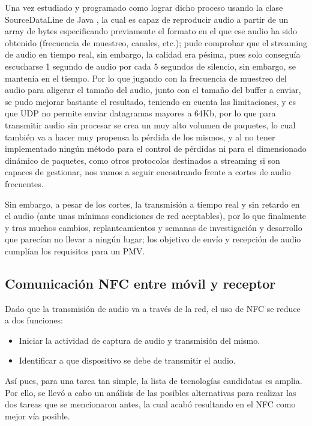 Una vez estudiado y programado como lograr dicho proceso usando la clase
SourceDataLine de Java \cite{java-SourceDataLine}, la cual es capaz de
reproducir audio a partir de un array de bytes especificando previamente el
formato en el que ese audio ha sido obtenido (frecuencia de muestreo, canales,
etc.); pude comprobar que el streaming de audio en tiempo real, sin embargo, la
calidad era pésima, pues solo conseguía escucharse 1 segundo de audio por cada 5
segundos de silencio, sin embargo, se mantenía en el tiempo. Por lo que jugando
con la frecuencia de muestreo del audio para aligerar el tamaño del audio, junto
con el tamaño del buffer a enviar, se pudo mejorar bastante el resultado,
teniendo en cuenta las limitaciones, y es que UDP no permite enviar datagramas
mayores a 64Kb, por lo que para transmitir audio sin procesar se crea un muy
alto volumen de paquetes, lo cual también va a hacer muy propensa la pérdida de
los mismos, y al no tener implementado ningún método para el control de pérdidas
ni para el dimensionado dinámico de paquetes, como otros protocolos destinados a
streaming si son capaces de gestionar, nos vamos a seguir encontrando frente a
cortes de audio frecuentes. 

Sin embargo, a pesar de los cortes, la transmisión a tiempo real y sin retardo en
el audio (ante unas mínimas condiciones de red aceptables), por lo que
finalmente y tras muchos cambios, replanteamientos y semanas de investigación y
desarrollo que parecían no llevar a ningún lugar; los objetivo de envío y
recepción de audio cumplían los requisitos para un PMV.


\subsection{Comunicación NFC entre móvil y receptor}

Dado que la transmisión de audio va a través de la red, el uso de NFC se reduce
a dos funciones: 

\begin{itemize}
    \item Iniciar la actividad de captura de audio y transmisión del mismo.
    \item Identificar a que dispositivo se debe de transmitir el audio.
\end{itemize}

Así pues, para una tarea tan simple, la lista de tecnologías candidatas es
amplia. Por ello, se llevó a cabo un análisis de las posibles alternativas para
realizar las dos tareas que se mencionaron antes, la cual acabó resultando
en el NFC como mejor vía posible.

